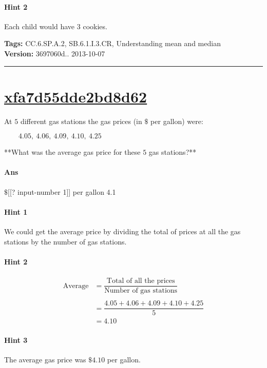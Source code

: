 \documentclass[twocolumn,10pt]{article}
\begin{document}
\paragraph{Hint 2}Each child would have $3$ cookies.



\medskip
\noindent
\textbf{Tags:} {\footnotesize CC.6.SP.A.2, SB.6.1.I.3.CR, Understanding mean and median}\\
\textbf{Version:} 3697060d.. 2013-10-07
\smallskip\hrule





\section{\href{https://www.khanacademy.org/devadmin/content/items/xfa7d55dde2bd8d62}{xfa7d55dde2bd8d62}}

\noindent
At $5$ different gas stations the gas prices (in $\$$ per gallon) were:  

$\qquad4.05, ~4.06, ~4.09, ~4.10, ~4.25$

**What was the average gas price for these $5$ gas stations?**

\paragraph{Ans} $\$$[[? input-number 1]] per gallon  4.1

\paragraph{Hint 1}We could get the average price by dividing the total of prices at all the gas stations by the number of gas stations.

\paragraph{Hint 2}\begin{align*}\text{Average} &= \dfrac{\text{Total of all the prices}}{\text{Number of gas stations}}\\
\\
&= \dfrac{4.05+4.06+4.09+4.10+4.25}{5}\\
&=4.10\end{align*}

\paragraph{Hint 3}The average gas price was $\$4.10$ per gallon.
\end{document}
